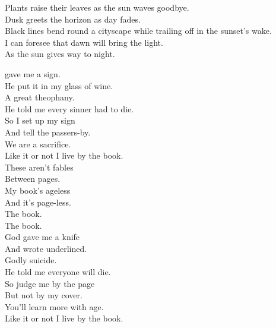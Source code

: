 Plants raise their leaves as the sun waves goodbye. \\
Dusk greets the horizon as day fades. \\
Black lines bend round a cityscape while trailing off in the sunset's wake. \\
I can foresee that dawn will bring the light. \\
As the sun gives way to night. \\




 gave me a sign. \\
He put it in my glass of wine. \\
A great theophany. \\
He told me every sinner had to die. \\
So I set up my sign \\
And tell the passers-by. \\
We are a sacrifice. \\
Like it or not I live by the book. \\

These aren't fables \\
Between pages. \\
My book's ageless \\
And it's page-less. \\

The book. \\
The book. \\

God gave me a knife \\
And wrote  underlined. \\
Godly suicide. \\
He told me everyone will die. \\
So judge me by the page \\
But not by my cover. \\
You'll learn more with age. \\
Like it or not I live by the book. \\




